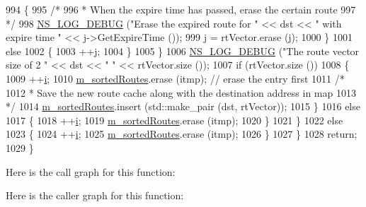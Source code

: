 \begin{DoxyCode}
994                 \{
995                   \textcolor{comment}{/*}
996 \textcolor{comment}{                   * When the expire time has passed, erase the certain route}
997 \textcolor{comment}{                   */}
998                   \hyperlink{group__logging_ga413f1886406d49f59a6a0a89b77b4d0a}{NS\_LOG\_DEBUG} (\textcolor{stringliteral}{"Erase the expired route for "} << dst << \textcolor{stringliteral}{" with expire time "} 
      << j->GetExpireTime ());
999                   j = rtVector.erase (j);
1000                 \}
1001               \textcolor{keywordflow}{else}
1002                 \{
1003                   ++j;
1004                 \}
1005             \}
1006           \hyperlink{group__logging_ga413f1886406d49f59a6a0a89b77b4d0a}{NS\_LOG\_DEBUG} (\textcolor{stringliteral}{"The route vector size of 2 "} << dst << \textcolor{stringliteral}{" "} << rtVector.size ());
1007           \textcolor{keywordflow}{if} (rtVector.size ())
1008             \{
1009               ++\hyperlink{bernuolliDistribution_8m_a6f6ccfcf58b31cb6412107d9d5281426}{i};
1010               \hyperlink{classns3_1_1dsr_1_1DsrRouteCache_a8d3530713c7152dbe42d0b616d9c1d96}{m\_sortedRoutes}.erase (itmp); \textcolor{comment}{// erase the entry first}
1011               \textcolor{comment}{/*}
1012 \textcolor{comment}{               * Save the new route cache along with the destination address in map}
1013 \textcolor{comment}{               */}
1014               \hyperlink{classns3_1_1dsr_1_1DsrRouteCache_a8d3530713c7152dbe42d0b616d9c1d96}{m\_sortedRoutes}.insert (std::make\_pair (dst, rtVector));
1015             \}
1016           \textcolor{keywordflow}{else}
1017             \{
1018               ++\hyperlink{bernuolliDistribution_8m_a6f6ccfcf58b31cb6412107d9d5281426}{i};
1019               \hyperlink{classns3_1_1dsr_1_1DsrRouteCache_a8d3530713c7152dbe42d0b616d9c1d96}{m\_sortedRoutes}.erase (itmp);
1020             \}
1021         \}
1022       \textcolor{keywordflow}{else}
1023         \{
1024           ++\hyperlink{bernuolliDistribution_8m_a6f6ccfcf58b31cb6412107d9d5281426}{i};
1025           \hyperlink{classns3_1_1dsr_1_1DsrRouteCache_a8d3530713c7152dbe42d0b616d9c1d96}{m\_sortedRoutes}.erase (itmp);
1026         \}
1027     \}
1028   \textcolor{keywordflow}{return};
1029 \}
\end{DoxyCode}


Here is the call graph for this function\+:




Here is the caller graph for this function\+:



